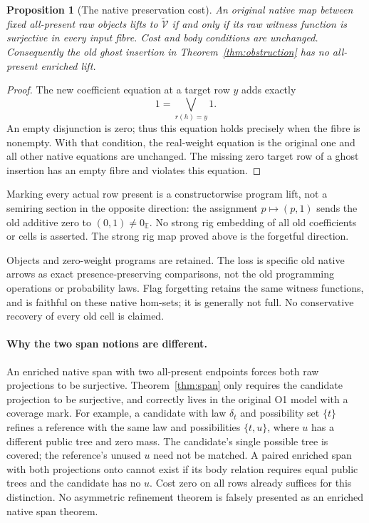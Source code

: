 \documentclass[11pt,a4paper]{article}
\newtheorem{proposition}[theorem]{Proposition}
\theoremstyle{definition}
\newcommand{\E}{\mathbb E}
\begin{document}
\begin{proposition}[The native preservation cost]\label{prop:E-native}
An original native map between fixed all-present raw objects lifts to
$\widetilde{\mathcal V}$ if and only if its raw witness function is
surjective in every input fibre. Cost and body conditions are unchanged.
Consequently the old ghost insertion in
Theorem~\ref{thm:obstruction} has no all-present enriched lift.
\end{proposition}
\begin{proof}
The new coefficient equation at a target row $y$ adds exactly
\[
 1=\bigvee_{r(h)=y}1.
\]
An empty disjunction is zero; thus this equation holds precisely when
the fibre is nonempty. With that condition, the real-weight equation is
the original one and all other native equations are unchanged. The
missing zero target row of a ghost insertion has an empty fibre and
violates this equation.
\end{proof}
Marking every actual row present is a constructorwise program lift, not
a semiring section in the opposite direction: the assignment
$p\mapsto(p,1)$ sends the old additive zero to $(0,1)\neq0_{\E}$.
No strong rig embedding of all old coefficients or cells is asserted.
The strong rig map proved above is the forgetful direction.

Objects and zero-weight programs are retained. The loss is specific old
native arrows as exact presence-preserving comparisons, not the old
programming operations or probability laws. Flag forgetting retains
the same witness functions, and is faithful on these native hom-sets;
it is generally not full. No conservative recovery of every old cell
is claimed.

\paragraph{Why the two span notions are different.}
An enriched native span with two all-present endpoints forces both raw
projections to be surjective. Theorem~\ref{thm:span} only requires the
candidate projection to be surjective, and correctly lives in the
original O1 model with a coverage mark. For example, a candidate with
law $\delta_t$ and possibility set $\{t\}$ refines a reference with the
same law and possibilities $\{t,u\}$, where $u$ has a different public
tree and zero mass. The candidate's single possible tree is covered;
the reference's unused $u$ need not be matched. A paired enriched span
with both projections onto cannot exist if its body relation requires
equal public trees and the candidate has no $u$. Cost zero on all rows
already suffices for this distinction. No asymmetric refinement theorem
is falsely presented as an enriched native span theorem.
\end{document}

